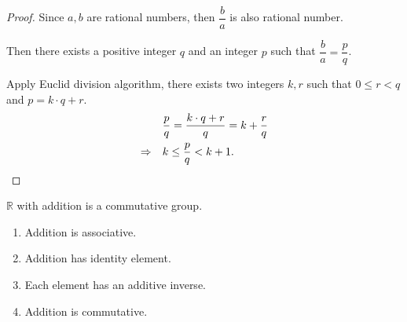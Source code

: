 \begin{proof}
    Since $a, b$ are rational numbers, then $\dfrac{b}{a}$ is also rational number.

    Then there exists a positive integer $q$ and an integer $p$ such that $\dfrac{b}{a} = \dfrac{p}{q}$.

    Apply Euclid division algorithm, there exists two integers $k, r$ such that $0\le r < q$ and $p = k\cdot q + r$.
    \begin{align*}
                         & \frac{p}{q} = \frac{k\cdot q + r}{q} = k + \frac{r}{q} \\
        \Rightarrow\quad & k \le \frac{p}{q} < k + 1.\qedhere
    \end{align*}
\end{proof}

\begin{theorem}\label{theorem:chapter1:real-field-part-one}
    $\mathbb{R}$ with addition is a commutative group.
    \begin{enumerate}[label={(F\arabic*)},itemsep=0pt]
        \item Addition is associative.
        \item Addition has identity element.
        \item Each element has an additive inverse.
        \item Addition is commutative.
    \end{enumerate}
\end{theorem}

